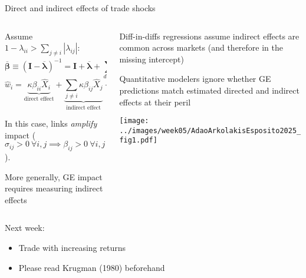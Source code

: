 \documentclass[11pt,notes=hide,aspectratio=169]{beamer}
\begin{document}
\begin{frame}{Direct and indirect effects of trade shocks}
\begin{columns}
\begin{column}{0.44\textwidth}
\begin{itemize}{\small
    \item Assume $1-\lambda_{ii}>\sum_{j\ne i}|\lambda_{ij}|$:
    $$ \mathbf{\overline{\beta}}\equiv(\mathbf{I}-\mathbf{\overline{\lambda}})^{-1}=\mathbf{I}+\mathbf{\overline{\lambda}}+\sum_{d=2}^{\infty}\mathbf{\overline{\lambda}}^{d} $$
    $$ \hat{w}_{i}=\underbrace{\kappa\beta_{ii}\hat{X}_{i}}_{\text{direct effect}} + \underbrace{\sum_{j\ne i}\kappa\beta_{ij}\hat{X}_{j}}_{\text{indirect effect}} + \hat{v}_{i}^{\omega} $$
    \item In this case, links \textit{amplify} impact ($\sigma_{ij}>0 \ \forall i,j \implies \beta_{ij}>0 \ \forall i,j$).
    \item More generally, GE impact requires measuring indirect effects
\par}\end{itemize}
\end{column}
\begin{column}{0.54\textwidth}
\begin{itemize}{\small
    \item Diff-in-diffs regressions assume indirect effects are common across markets (and therefore in the missing intercept)
    \item Quantitative modelers ignore whether GE predictions match estimated directed and indirect effects at their peril
\par}\end{itemize}
\texttt{[image: ../images/week05/AdaoArkolakisEsposito2025\_fig1.pdf]}
\end{column}
\end{columns}
\end{frame}
\begin{frame}[plain]
Next week:
\begin{itemize}
\item Trade with increasing returns
\item Please read Krugman (1980) beforehand
\end{itemize}
\end{frame}
\end{document}
